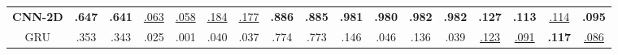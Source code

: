 \begin{table}[t]
{\begin{tabular}{@{} p{0.9cm} p{0.55cm} p{0.55cm} p{0.55cm} p{0.55cm} p{0.55cm} p{0.55cm} p{0.55cm} p{0.55cm} p{0.55cm} p{0.55cm} p{0.55cm} p{0.55cm} p{0.55cm} p{0.52cm} p{0.52cm} p{0.52cm} p{0.52cm} @{}}
\multicolumn{2}{c}{\textbf{CNN-2D}}
  & \multicolumn{1}{c}{{\textbf{.647}}}   %
  & \multicolumn{1}{c}{{\textbf{.641}}}   %
  & \multicolumn{1}{c}{{\underline{.063}}} %
  & \multicolumn{1}{c}{{\underline{.058}}} %
  & \multicolumn{1}{c}{{\underline{.184}}}            %
  & \multicolumn{1}{c}{{\underline{.177}}} %
  & \multicolumn{1}{c}{{\textbf{.886}}}   %
  & \multicolumn{1}{c}{{\textbf{.885}}}   %
  & \multicolumn{1}{c}{{\textbf{.981}}}   %
  & \multicolumn{1}{c}{{\textbf{.980}}}   %
  & \multicolumn{1}{c}{{\textbf{.982}}}   %
  & \multicolumn{1}{c}{{\textbf{.982}}}   %
  & \multicolumn{1}{c}{{\textbf{.127}}}   %
  & \multicolumn{1}{c}{{\textbf{.113}}}   %
  & \multicolumn{1}{c}{{\underline{.114}}} %
  & \multicolumn{1}{c}{{\textbf{.095}}}   %
  \\

\multicolumn{2}{c}{GRU}     
  & \multicolumn{1}{c}{.353}            
  & \multicolumn{1}{c}{.343}            
  & \multicolumn{1}{c}{.025}            
  & \multicolumn{1}{c}{.001}            
  & \multicolumn{1}{c}{.040}            
  & \multicolumn{1}{c}{.037}            
  & \multicolumn{1}{c}{.774}            
  & \multicolumn{1}{c}{.773}            
  & \multicolumn{1}{c}{.146}            
  & \multicolumn{1}{c}{.046}            
  & \multicolumn{1}{c}{.136}            
  & \multicolumn{1}{c}{.039}            
  & \multicolumn{1}{c}{{\underline{.123}}} %
  & \multicolumn{1}{c}{{\underline{.091}}} %
  & \multicolumn{1}{c}{{\textbf{.117}}}   %
  & \multicolumn{1}{c}{{\underline{.086}}} %
  \\


\end{tabular}}
\end{table}
